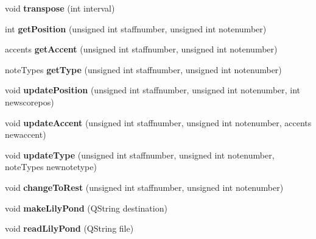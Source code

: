 \begin{DoxyCompactItemize}
\item 
\hypertarget{class_score_view_model_adc09e48006e07d05cd06d28f85731ec4}{}void {\bfseries transpose} (int interval)\label{class_score_view_model_adc09e48006e07d05cd06d28f85731ec4}

\item 
\hypertarget{class_score_view_model_afc656d3b87cfcab65e2e2df84275811d}{}int {\bfseries get\+Position} (unsigned int staffnumber, unsigned int notenumber)\label{class_score_view_model_afc656d3b87cfcab65e2e2df84275811d}

\item 
\hypertarget{class_score_view_model_ac9ba2d57c16d6e20f4c3da111b73615f}{}accents {\bfseries get\+Accent} (unsigned int staffnumber, unsigned int notenumber)\label{class_score_view_model_ac9ba2d57c16d6e20f4c3da111b73615f}

\item 
\hypertarget{class_score_view_model_a6714358745b284c08d6cec01449ff306}{}note\+Types {\bfseries get\+Type} (unsigned int staffnumber, unsigned int notenumber)\label{class_score_view_model_a6714358745b284c08d6cec01449ff306}

\item 
\hypertarget{class_score_view_model_ab83b04a6d5678338e8b5712d5715048d}{}void {\bfseries update\+Position} (unsigned int staffnumber, unsigned int notenumber, int newscorepos)\label{class_score_view_model_ab83b04a6d5678338e8b5712d5715048d}

\item 
\hypertarget{class_score_view_model_a634fd237d616540d5031a64a72d3ddbf}{}void {\bfseries update\+Accent} (unsigned int staffnumber, unsigned int notenumber, accents newaccent)\label{class_score_view_model_a634fd237d616540d5031a64a72d3ddbf}

\item 
\hypertarget{class_score_view_model_ad78152fc30e09d58422e4671462d5884}{}void {\bfseries update\+Type} (unsigned int staffnumber, unsigned int notenumber, note\+Types newnotetype)\label{class_score_view_model_ad78152fc30e09d58422e4671462d5884}

\item 
\hypertarget{class_score_view_model_ac2247ce41cb07e55d007819e55dbc47b}{}void {\bfseries change\+To\+Rest} (unsigned int staffnumber, unsigned int notenumber)\label{class_score_view_model_ac2247ce41cb07e55d007819e55dbc47b}

\item 
\hypertarget{class_score_view_model_a99a64a7bd6e22a14eaf2920c44b1ca4a}{}void {\bfseries make\+Lily\+Pond} (Q\+String destination)\label{class_score_view_model_a99a64a7bd6e22a14eaf2920c44b1ca4a}

\item 
\hypertarget{class_score_view_model_a2ddc643ffec7b39df6e6b5fab7ab9e66}{}void {\bfseries read\+Lily\+Pond} (Q\+String file)\label{class_score_view_model_a2ddc643ffec7b39df6e6b5fab7ab9e66}

\end{DoxyCompactItemize}



